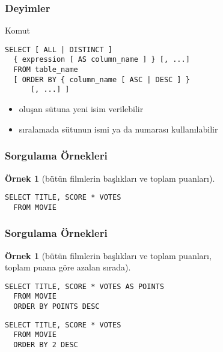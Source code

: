 \documentclass[dvipsnames]{beamer}
\theoremstyle{definition}
\theoremstyle{example}
\newtheorem{ornek}[theorem]{Örnek}
\theoremstyle{plain}
\begin{document}
\begin{frame}[fragile]
  \frametitle{Deyimler}

  \begin{block}{Komut}
    \begin{lstlisting}
SELECT [ ALL | DISTINCT ]
  { expression [ AS column_name ] } [, ...]
  FROM table_name
  [ ORDER BY { column_name [ ASC | DESC ] }
      [, ...] ]
    \end{lstlisting}
  \end{block}

  \pause
  \begin{itemize}
    \item oluşan sütuna yeni isim verilebilir
    \item sıralamada sütunun ismi ya da numarası kullanılabilir
  \end{itemize}
\end{frame}

\begin{frame}[fragile]
  \frametitle{Sorgulama Örnekleri}

  \begin{ornek}[bütün filmlerin başlıkları ve toplam puanları]
    \begin{lstlisting}
SELECT TITLE, SCORE * VOTES
  FROM MOVIE
    \end{lstlisting}
  \end{ornek}
\end{frame}

\begin{frame}[fragile]
  \frametitle{Sorgulama Örnekleri}

  \begin{ornek}[bütün filmlerin başlıkları ve toplam puanları,\\
                toplam puana göre azalan sırada]
    \begin{lstlisting}
SELECT TITLE, SCORE * VOTES AS POINTS
  FROM MOVIE
  ORDER BY POINTS DESC
    \end{lstlisting}

    \pause
    \begin{lstlisting}
SELECT TITLE, SCORE * VOTES
  FROM MOVIE
  ORDER BY 2 DESC
    \end{lstlisting}
  \end{ornek}
\end{frame}
\end{document}
